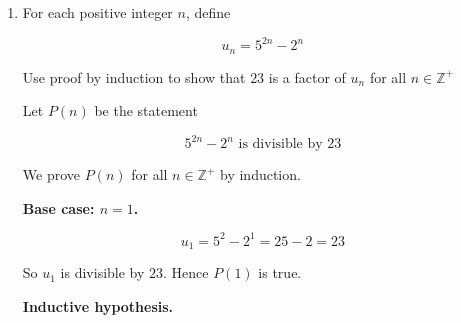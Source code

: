 \documentclass[leqno]{article}
\newcommand{\questionitem}{%
  \item\phantomsection
  \addcontentsline{toc}{section}{Question \number\value{enumi}}%
}
\begin{document}
\begin{enumerate}[
  label=\textbf{\arabic*.},
  leftmargin=*,
  topsep=0pt,
  partopsep=0pt,
  parsep=0pt
]
\begin{tcolorbox}[colback=white, colframe=scarlet, title={\textbf{Solution}}, breakable, grow to left by=6mm, grow to right by=10mm]
Starting with this expression,
\begin{align*}
2^{k+1} + 2\times 3^{2k+2} + 4^{2k+3}
&= 2\cdot 2^k + 2\cdot 3^2\cdot 3^{2k} + 4^2\cdot 4^{2k+1} \\
&= 2\cdot 2^k + 18\cdot 3^{2k} + 16\cdot 4^{2k+1} \\
&= 2\bigl(2^k + 2\times 3^{2k} + 4^{2k+1}\bigr) + 14\cdot 3^{2k} + 14\cdot 4^{2k+1}
\end{align*}

Now use the inductive hypothesis \(2^k + 2\times 3^{2k} + 4^{2k+1}=7m\):
\begin{align*}
2^{k+1} + 2\times 3^{2k+2} + 4^{2k+3}
&= 2(7m) + 14\cdot 3^{2k} + 14\cdot 4^{2k+1} \\
&= 14m + 14\bigl(3^{2k} + 4^{2k+1}\bigr) \\
&= 7\bigl(2m + 2\cdot 3^{2k} + 2\cdot 4^{2k+1}\bigr)
\end{align*}

This is \(7\) multiplied by an integer, so it is divisible by \(7\). Therefore \(P(k+1)\) is true.

Since \(P(0)\) is true and \(P(k)\Rightarrow P(k+1)\), it follows by mathematical induction that
\[
2^n + 2\times 3^{2n} + 4^{2n+1}
\]
is divisible by \(7\) for all non-negative integers \(n\).
\end{tcolorbox}


\newpage

\questionitem

For each positive integer $n$, define

\[u_n=5^{2n}-2^n\]

Use proof by induction to show that $23$ is a factor of $u_n$ for all $n \in \mathbb{Z}^+$ 

\vspace*{30pt}

\begin{tcolorbox}[colback=white, colframe=scarlet, title={\textbf{Solution}}, breakable, grow to left by=6mm, grow to right by=10mm]
Let \(P(n)\) be the statement

\[
5^{2n}-2^n \text{ is divisible by } 23
\]

We prove \(P(n)\) for all \(n \in \mathbb{Z}^+\) by induction.

\textbf{Base case: \(n=1\).}

\[
u_1=5^{2}-2^1=25-2=23
\]

So \(u_1\) is divisible by \(23\). Hence \(P(1)\) is true.

\textbf{Inductive hypothesis.}


\end{tcolorbox}
\end{enumerate}
\end{document}
